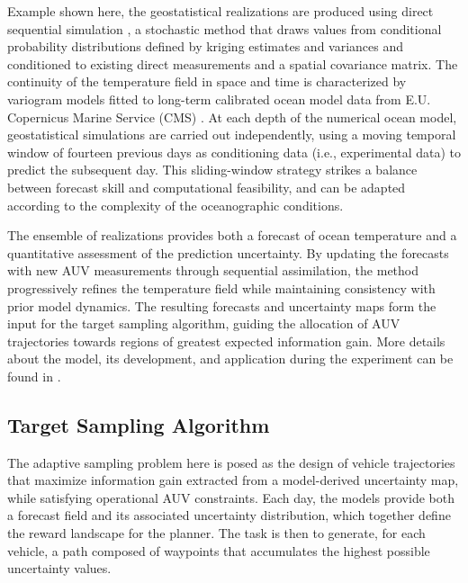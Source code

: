 Example shown here, the geostatistical realizations are produced using direct sequential simulation \cite{soares2001direct}, a stochastic method that draws values from conditional probability distributions defined by kriging estimates and variances and conditioned to existing
direct measurements and a spatial covariance matrix. The continuity of the temperature field in space and time is characterized by variogram models fitted to long-term calibrated ocean model data from E.U. Copernicus Marine Service (CMS) \cite{CMEMS2017}. At each depth of the numerical ocean model, geostatistical simulations are carried out independently, using a moving temporal window of fourteen previous   days as
conditioning data (i.e., experimental data) to predict the subsequent day. This sliding-window strategy strikes a balance between forecast skill and computational feasibility, and can be adapted according to the complexity of the oceanographic conditions.

The ensemble of realizations provides both a forecast of ocean
temperature and a quantitative assessment of the prediction
uncertainty.  By updating the forecasts with new AUV measurements
through sequential assimilation, the method progressively refines the
temperature field while maintaining consistency with prior model
dynamics. The resulting forecasts and uncertainty maps form the input
for the target sampling algorithm, guiding the allocation of AUV
trajectories towards regions of greatest expected information
gain. More details about the model, its development, and application
during the \proj experiment can be found in \cite{Duarte2025}.

\subsection{Target Sampling Algorithm}

The adaptive sampling problem here is posed as the design of vehicle
trajectories that maximize information gain
\cite{eidsvik2015,fossum18} extracted from a model-derived uncertainty
map, while satisfying operational AUV constraints. Each day, the
models provide both a forecast field and its associated uncertainty
distribution, which together define the reward landscape for the
planner. The task is then to generate, for each vehicle, a path
composed of waypoints that accumulates the highest possible
uncertainty values.

